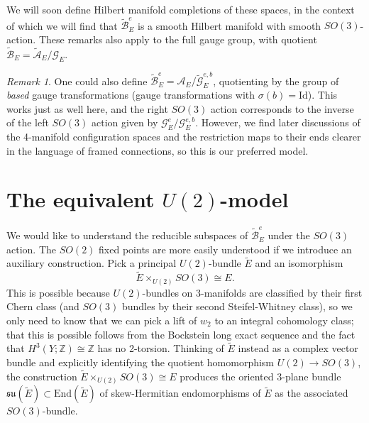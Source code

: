 \documentclass{memo-l}
\theoremstyle{definition}
\theoremstyle{remark}
\newtheorem{remark}[theorem]{Remark}
\numberwithin{section}{chapter}
\numberwithin{equation}{chapter}
\begin{document}
We will soon define Hilbert manifold completions of these spaces, in the context of which we will find that $\widetilde{\mathcal B}^e_E$ is a smooth Hilbert manifold with smooth $SO(3)$-action. These remarks also apply to the full gauge group, with quotient $\widetilde{\mathcal B}_E = \widetilde{\mathcal A}_E/\mathcal G_E$.

\begin{remark}One could also define $\widetilde{\mathcal B}^e_E = \mathcal A_E/\widetilde{\mathcal G}_E^{e,b}$, quotienting by the group of \textit{based} gauge transformations (gauge transformations with $\sigma(b) = \text{Id}$). This works just as well here, and the right $SO(3)$ action corresponds to the inverse of the left $SO(3)$ action given by $\mathcal G_E^e/\mathcal G_E^{e,b}$. However, we find later discussions of the 4-manifold configuration spaces and the restriction maps to their ends clearer in the language of framed connections, so this is our preferred model.
\end{remark}

\section{The equivalent $U(2)$-model}\label{sec:config-U2}
We would like to understand the reducible subspaces of $\widetilde{\mathcal B}^e_E$ under the $SO(3)$ action. The $SO(2)$ fixed points are more easily understood if we introduce an auxiliary construction. Pick a principal $U(2)$-bundle $\tilde E$ and an isomorphism $$\tilde E \times_{U(2)} SO(3) \cong E.$$ This is possible because $U(2)$-bundles on 3-manifolds are classified by their first Chern class (and $SO(3)$ bundles by their second Steifel-Whitney class), so we only need to know that we can pick a lift of $w_2$ to an integral cohomology class; that this is possible follows from the Bockstein long exact sequence and the fact that $H^3(Y;\mathbb Z) \cong \mathbb Z$ has no 2-torsion. Thinking of $\tilde E$ instead as a complex vector bundle and explicitly identifying the quotient homomorphism $U(2) \to SO(3)$, the construction $\tilde E \times_{U(2)} SO(3) \cong E$ produces the oriented 3-plane bundle $\mathfrak{su}(\tilde E) \subset \text{End}(\tilde E)$ of skew-Hermitian endomorphisms of $\tilde E$ as the associated $SO(3)$-bundle.
\end{document}
